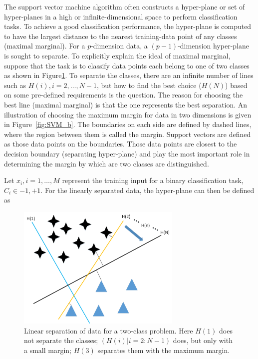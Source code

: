 The support vector machine algorithm \citep{cortes1995support} often constructs a hyper-plane or set of hyper-planes in a high or infinite-dimensional space to perform classification tasks. To achieve a good classification performance, the hyper-plane is computed to have the largest distance to the nearest training-data point of any classes (maximal marginal). For a $p$-dimension data, a $(p-1)$-dimension hyper-plane is sought to separate. To explicitly explain the ideal of maximal marginal, suppose that the task is to classify data points each belong to one of two classes as shown in Figure\ref{fig:SVM_a}. To separate the classes, there are an infinite number of lines such as $H(i),i=2,…,N-1$, but how to find the best choice ($H(N)$) based on some pre-defined requirements is the question. The reason for choosing the best line (maximal marginal) is that the one represents the best separation.  An illustration of choosing the maximum margin for data in two dimensions is given in Figure~\ref{fig:SVM_b}. The boundaries on each side are defined by dashed lines, where the region between them is called the margin. Support vectors are defined as those data points on the boundaries.  Those data points are closest to the decision boundary (separating hyper-plane) and play the most important role in determining the margin by which are two classes are distinguished. 

Let $x_{i},i=1,\ldots ,M$ represent the training input for a binary classification task, $C_{i} \in {-1,+1}$. For the linearly separated data, the hyper-plane can then be defined as
  
\begin{figure}[htb!]
\centering
\includegraphics[width=0.7\textwidth]{image/Method/SVM.png}
\caption[A SVM classifier]{Linear separation of data for a two-class problem. Here $H(1)$ does not separate the classes; $(H(i)|i = 2:N-1)$ does, but only with a small margin; $H(3)$ separates them with the maximum margin.}
\label{fig:SVM_a}
\end{figure}
  
